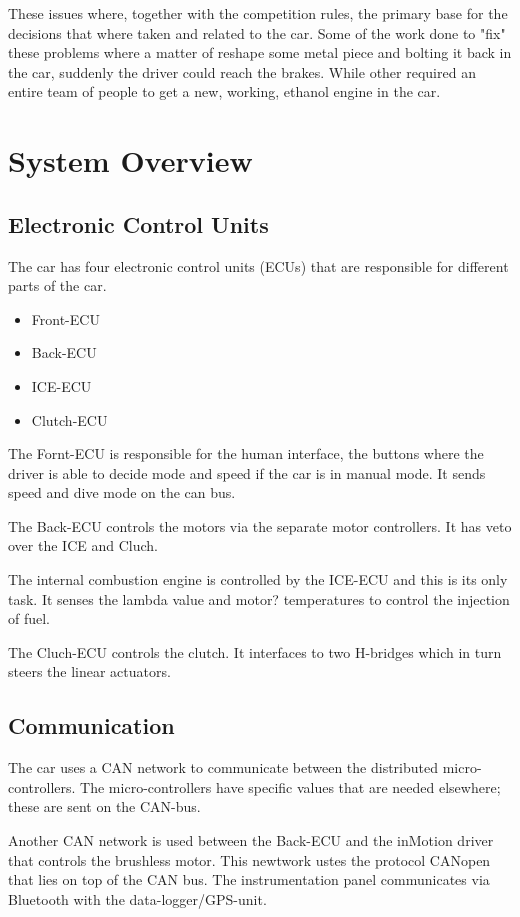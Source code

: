 These issues where, together with the competition rules, the primary base for the decisions that where taken and related to the car. Some of the work done to "fix" these problems where a matter of reshape some metal piece and bolting it back in the car, suddenly the driver could reach the brakes. While other required an entire team of people to get a new, working, ethanol engine in the car.

\section{System Overview}
\subsection{Electronic Control Units}
The car has four electronic control units (ECUs) that are responsible for different parts of the car.

\begin{itemize}
\item Front-ECU
\item Back-ECU
\item ICE-ECU
\item Clutch-ECU
\end{itemize}

The Fornt-ECU is responsible for the human interface, the buttons where the driver is able to decide mode and speed if the car is in manual mode. It sends speed and dive mode on the can bus.

The Back-ECU controls the motors via the separate motor controllers. It has veto over the ICE and Cluch.

The internal combustion engine is controlled by the ICE-ECU and this is its only task. It senses the lambda value and motor? temperatures to control the injection of fuel.

The Cluch-ECU controls the clutch. It interfaces to two H-bridges which in turn steers the linear actuators.  

\subsection{Communication}
The car uses a CAN network to communicate between the distributed micro-controllers. The micro-controllers have specific values that are needed elsewhere; these are sent on the CAN-bus. 

Another CAN network is used between the Back-ECU and the inMotion driver that controls the brushless motor. This newtwork ustes the protocol CANopen that lies on top of the CAN bus.
The instrumentation panel communicates via Bluetooth with the data-logger/GPS-unit.

